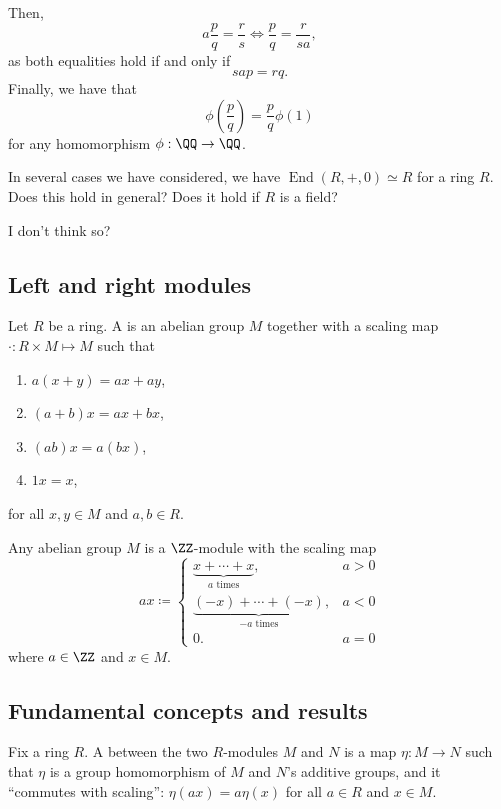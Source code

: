 \documentclass{article}
\newcommand*\isom{\ensuremath{\simeq}}
\newcommand*\End{\ensuremath{\operatorname{End}}}
\begin{document}
Then, 
\[
    a\frac{p}{q} = \frac{r}{s} \iff \frac{p}{q} = \frac{r}{sa},
\]
as both equalities hold if and only if
\[
    sap = rq.
\]
Finally, we have that
\[
    \phi\left(\frac{p}{q}\right)
    =
    \frac{p}{q} \phi(1)
\]
for any homomorphism $\phi: \QQ \to \QQ$.

\begin{exercise}
    In several cases we have considered, we have $\End(R,+,0) \isom R$ for a ring $R$.
    Does this hold in general? Does it hold if $R$ is a field?
\end{exercise}

I don't think so?

\subsection{Left and right modules}

\begin{definition}
    Let $R$ be a ring.
    A  is an abelian group $M$ together with a scaling map $\cdot : R \times M \mapsto M$ such that
    \begin{enumerate}
        \item
            $a(x+y) = ax + ay$,
        \item 
            $(a+b)x = ax + bx$,
        \item 
            $(ab)x = a(bx)$,
        \item 
            $1x = x$,
    \end{enumerate}
    for all $x, y \in M$ and $a,b \in R$.
\end{definition}

\begin{proposition}
    Any abelian group $M$ is a $\ZZ$-module with the scaling map
    \[
        ax
        \coloneq
        \begin{cases}
            \underbrace{x + \cdots + x}_{a \text{ times}}, & a > 0 \\
            \underbrace{(-x) + \cdots + (-x)}_{-a \text{ times}}, & a < 0 \\
            0. & a = 0
        \end{cases}
    \]
    where $a \in \ZZ$ and $x \in M$.
\end{proposition}

\subsection{Fundamental concepts and results}

\begin{definition}
    Fix a ring $R$.
    A  between the two $R$-modules $M$ and $N$ is a map $\eta: M \to N$ such that $\eta$ is a group homomorphism of $M$ and $N$'s additive groups, and it ``commutes with scaling'': $\eta(ax) = a\eta(x)$ for all $a \in R$ and $x \in M$.
\end{definition}
\end{document}
